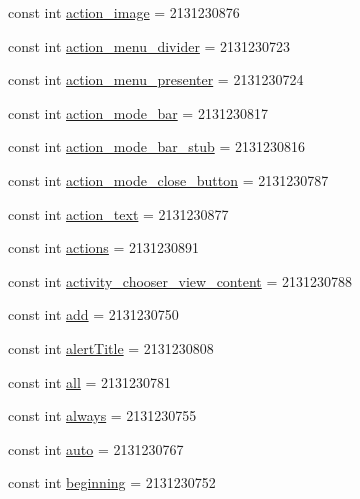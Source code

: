 \begin{CompactItemize}
\item 
const int \hyperlink{class__2doo_1_1_droid_1_1_resource_1_1_id_f79a855a04afaa3b82b8dc1ac94b2ca7}{action\_\-image} = 2131230876
\item 
const int \hyperlink{class__2doo_1_1_droid_1_1_resource_1_1_id_5552f14c3fb375cbb9b320eeccf045bf}{action\_\-menu\_\-divider} = 2131230723
\item 
const int \hyperlink{class__2doo_1_1_droid_1_1_resource_1_1_id_44d17380d253103b00e28d33c9693adf}{action\_\-menu\_\-presenter} = 2131230724
\item 
const int \hyperlink{class__2doo_1_1_droid_1_1_resource_1_1_id_41ef793fd7f1cd11de880520e5fa9d52}{action\_\-mode\_\-bar} = 2131230817
\item 
const int \hyperlink{class__2doo_1_1_droid_1_1_resource_1_1_id_bd0410e3da1aa7912d94a95629682295}{action\_\-mode\_\-bar\_\-stub} = 2131230816
\item 
const int \hyperlink{class__2doo_1_1_droid_1_1_resource_1_1_id_58440a6597612fb33fd0a6260bf6a904}{action\_\-mode\_\-close\_\-button} = 2131230787
\item 
const int \hyperlink{class__2doo_1_1_droid_1_1_resource_1_1_id_d5bd01352ade95ab05a1ecd31a1aa8ee}{action\_\-text} = 2131230877
\item 
const int \hyperlink{class__2doo_1_1_droid_1_1_resource_1_1_id_3b16f72c43f3d6d4f7b66992c9996359}{actions} = 2131230891
\item 
const int \hyperlink{class__2doo_1_1_droid_1_1_resource_1_1_id_7e81078c6e98b2006613c0c9322e3549}{activity\_\-chooser\_\-view\_\-content} = 2131230788
\item 
const int \hyperlink{class__2doo_1_1_droid_1_1_resource_1_1_id_f18bb2c55508b03848d50c2b13ea2cda}{add} = 2131230750
\item 
const int \hyperlink{class__2doo_1_1_droid_1_1_resource_1_1_id_ca5dca9b37618dfadea35051b9c6ef3d}{alertTitle} = 2131230808
\item 
const int \hyperlink{class__2doo_1_1_droid_1_1_resource_1_1_id_b0d0dd099b92c977ded6e2dcd57c30d6}{all} = 2131230781
\item 
const int \hyperlink{class__2doo_1_1_droid_1_1_resource_1_1_id_45846002a6cb7565268614e0983e35a2}{always} = 2131230755
\item 
const int \hyperlink{class__2doo_1_1_droid_1_1_resource_1_1_id_fa71d204796877908ca7716a0906dd80}{auto} = 2131230767
\item 
const int \hyperlink{class__2doo_1_1_droid_1_1_resource_1_1_id_2801e9d15736f320a0532aba68d446ee}{beginning} = 2131230752

\end{CompactItemize}
